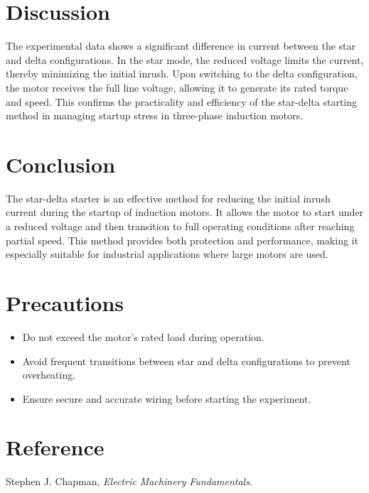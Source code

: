 \documentclass[a4paper,12pt]{article}
\begin{document}
	
	\section{Discussion}
	
	The experimental data shows a significant difference in current between the star and delta configurations. In the star mode, the reduced voltage limits the current, thereby minimizing the initial inrush. Upon switching to the delta configuration, the motor receives the full line voltage, allowing it to generate its rated torque and speed. This confirms the practicality and efficiency of the star-delta starting method in managing startup stress in three-phase induction motors.
	
	\section{Conclusion}
	
	The star-delta starter is an effective method for reducing the initial inrush current during the startup of induction motors. It allows the motor to start under a reduced voltage and then transition to full operating conditions after reaching partial speed. This method provides both protection and performance, making it especially suitable for industrial applications where large motors are used.
	
	\section{Precautions}
	
	\begin{itemize}
		\item Do not exceed the motor’s rated load during operation.
		\item Avoid frequent transitions between star and delta configurations to prevent overheating.
		\item Ensure secure and accurate wiring before starting the experiment.
	\end{itemize}
	
	\section{Reference}
	
	Stephen J. Chapman, \textit{Electric Machinery Fundamentals}.
	
	
	
\end{document}

